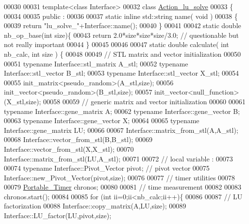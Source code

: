 \begin{DoxyCode}
00030 
00031 \textcolor{keyword}{template}<\textcolor{keyword}{class} Interface>
00032 \textcolor{keyword}{class }\hyperlink{class_action__lu__solve}{Action\_lu\_solve} 
00033 \{
00034 
00035 public :
00036 
00037   \textcolor{keyword}{static} \textcolor{keyword}{inline} std::string name( \textcolor{keywordtype}{void} )
00038   \{
00039     \textcolor{keywordflow}{return} \textcolor{stringliteral}{"lu\_solve\_"}+Interface::name();
00040   \}
00041   
00042   \textcolor{keyword}{static} \textcolor{keywordtype}{double} nb\_op\_base(\textcolor{keywordtype}{int} size)\{
00043     \textcolor{keywordflow}{return} 2.0*size*size*size/3.0;  \textcolor{comment}{// questionable but not really important}
00044   \}
00045 
00046 
00047   \textcolor{keyword}{static} \textcolor{keywordtype}{double} calculate( \textcolor{keywordtype}{int} nb\_calc, \textcolor{keywordtype}{int} size ) \{
00048 
00049     \textcolor{comment}{// STL matrix and vector initialization}
00050     
00051     \textcolor{keyword}{typename} Interface::stl\_matrix A\_stl;
00052     \textcolor{keyword}{typename} Interface::stl\_vector B\_stl;
00053     \textcolor{keyword}{typename} Interface::stl\_vector X\_stl;
00054 
00055     init\_matrix<pseudo\_random>(A\_stl,size);
00056     init\_vector<pseudo\_random>(B\_stl,size);
00057     init\_vector<null\_function>(X\_stl,size);
00058 
00059     \textcolor{comment}{// generic matrix and vector initialization}
00060 
00061     \textcolor{keyword}{typename} Interface::gene\_matrix A;
00062     \textcolor{keyword}{typename} Interface::gene\_vector B;
00063     \textcolor{keyword}{typename} Interface::gene\_vector X;
00064 
00065     \textcolor{keyword}{typename} Interface::gene\_matrix LU; 
00066 
00067     Interface::matrix\_from\_stl(A,A\_stl);
00068     Interface::vector\_from\_stl(B,B\_stl);
00069     Interface::vector\_from\_stl(X,X\_stl);
00070     Interface::matrix\_from\_stl(LU,A\_stl);
00071   
00072     \textcolor{comment}{// local variable :}
00073 
00074     \textcolor{keyword}{typename} Interface::Pivot\_Vector pivot; \textcolor{comment}{// pivot vector}
00075     Interface::new\_Pivot\_Vector(pivot,size);
00076     
00077     \textcolor{comment}{// timer utilities}
00078 
00079     \hyperlink{class_portable___timer}{Portable\_Timer} chronos;
00080 
00081     \textcolor{comment}{// time measurement}
00082 
00083     chronos.start();
00084     
00085     \textcolor{keywordflow}{for} (\textcolor{keywordtype}{int} ii=0;ii<nb\_calc;ii++)\{
00086 
00087       \textcolor{comment}{// LU factorization}
00088       Interface::copy\_matrix(A,LU,size);
00089       Interface::LU\_factor(LU,pivot,size);

\end{DoxyCode}
